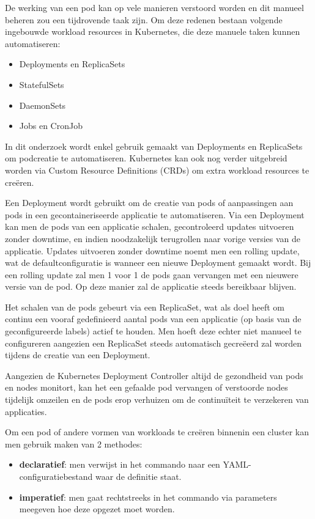 De werking van een pod kan op vele manieren verstoord worden en dit manueel beheren zou een tijdrovende taak zijn. Om deze redenen bestaan volgende ingebouwde workload resources in Kubernetes, die deze manuele taken kunnen automatiseren:
\begin{itemize}
    \item Deployments en ReplicaSets
    \item StatefulSets
    \item DaemonSets
    \item Jobs en CronJob
\end{itemize}   

In dit onderzoek wordt enkel gebruik gemaakt van Deployments en ReplicaSets om podcreatie te automatiseren. Kubernetes kan ook nog verder uitgebreid worden via Custom Resource Definitions (CRDs) om extra workload resources te creëren. 

Een Deployment wordt gebruikt om de creatie van pods of aanpassingen aan pods in een gecontaineriseerde applicatie te automatiseren. Via een Deployment kan men de pods van een applicatie schalen, gecontroleerd updates uitvoeren zonder downtime, en indien noodzakelijk terugrollen naar vorige versies van de applicatie.
Updates uitvoeren zonder downtime noemt men een rolling update, wat de defaultconfiguratie is wanneer een nieuwe Deployment gemaakt wordt. Bij een rolling update zal men 1 voor 1 de pods gaan vervangen met een nieuwere versie van de pod. Op deze manier zal de applicatie steeds bereikbaar blijven. 

Het schalen van de pods gebeurt via een ReplicaSet, wat als doel heeft om continu een vooraf gedefinieerd aantal pods van een applicatie (op basis van de geconfigureerde labels) actief te houden. Men hoeft deze echter niet manueel te configureren aangezien een ReplicaSet steeds automatisch gecreëerd zal worden tijdens de creatie van een Deployment. 

Aangezien de Kubernetes Deployment Controller altijd de gezondheid van pods en nodes monitort, kan het een gefaalde pod vervangen of verstoorde nodes tijdelijk omzeilen en de pods erop verhuizen om de continuïteit te verzekeren van applicaties. 

Om een pod of andere vormen van workloads te creëren binnenin een cluster kan men gebruik maken van 2 methodes: 
\begin{itemize}
    \item {\bf declaratief}: men verwijst in het commando naar een YAML-configuratiebestand waar de definitie staat.  
    \item {\bf imperatief}: men gaat rechtstreeks in het commando via parameters meegeven hoe deze opgezet moet worden.
\end{itemize}

